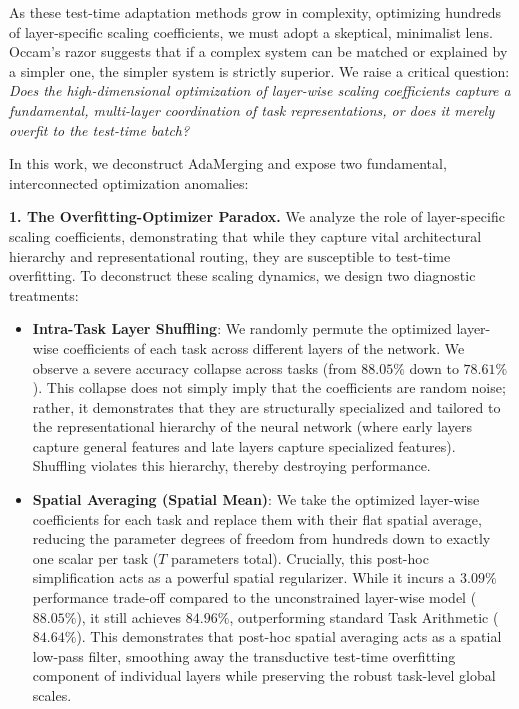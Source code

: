 As these test-time adaptation methods grow in complexity, optimizing hundreds of layer-specific scaling coefficients, we must adopt a skeptical, minimalist lens. Occam's razor suggests that if a complex system can be matched or explained by a simpler one, the simpler system is strictly superior. We raise a critical question: \emph{Does the high-dimensional optimization of layer-wise scaling coefficients capture a fundamental, multi-layer coordination of task representations, or does it merely overfit to the test-time batch?}

In this work, we deconstruct AdaMerging and expose two fundamental, interconnected optimization anomalies:

\textbf{1. The Overfitting-Optimizer Paradox.}
We analyze the role of layer-specific scaling coefficients, demonstrating that while they capture vital architectural hierarchy and representational routing, they are susceptible to test-time overfitting. To deconstruct these scaling dynamics, we design two diagnostic treatments:
\begin{itemize}
    \item \textbf{Intra-Task Layer Shuffling}: We randomly permute the optimized layer-wise coefficients of each task across different layers of the network. We observe a severe accuracy collapse across tasks (from $88.05\%$ down to $78.61\%$). This collapse does not simply imply that the coefficients are random noise; rather, it demonstrates that they are structurally specialized and tailored to the representational hierarchy of the neural network (where early layers capture general features and late layers capture specialized features). Shuffling violates this hierarchy, thereby destroying performance.
    \item \textbf{Spatial Averaging (Spatial Mean)}: We take the optimized layer-wise coefficients for each task and replace them with their flat spatial average, reducing the parameter degrees of freedom from hundreds down to exactly one scalar per task ($T$ parameters total). Crucially, this post-hoc simplification acts as a powerful spatial regularizer. While it incurs a $3.09\%$ performance trade-off compared to the unconstrained layer-wise model ($88.05\%$), it still achieves $84.96\%$, outperforming standard Task Arithmetic ($84.64\%$). This demonstrates that post-hoc spatial averaging acts as a spatial low-pass filter, smoothing away the transductive test-time overfitting component of individual layers while preserving the robust task-level global scales.
\end{itemize}

